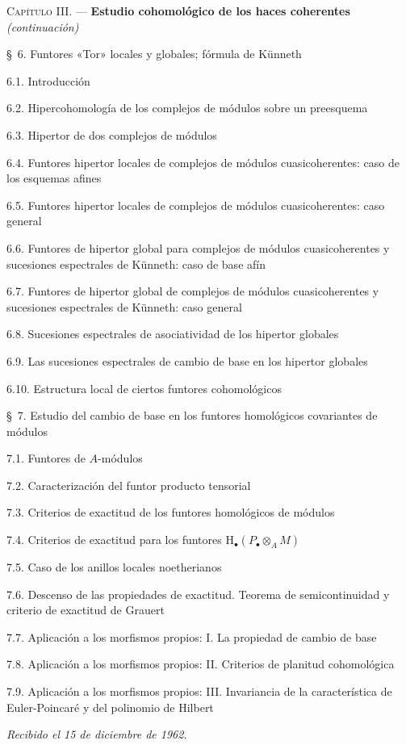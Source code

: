 \documentclass[10pt,oneside,openany]{book}
\theoremstyle{egaenv}\newtheorem*{env}{---}
\theoremstyle{egastatement}
\theoremstyle{egadescription}
\begin{document}
\begin{flushleft}
\textsc{Capítulo III.} --- \textbf{Estudio cohomológico de los haces coherentes}
\textit{(continuación)} 

\medskip
\S~6. Funtores «Tor» locales y globales; fórmula de Künneth 

6.1. Introducción 

6.2. Hipercohomología de los complejos de módulos sobre un preesquema 

6.3. Hipertor de dos complejos de módulos 

6.4. Funtores hipertor locales de complejos de módulos cuasicoherentes: caso
de los esquemas afines 

6.5. Funtores hipertor locales de complejos de módulos cuasicoherentes: caso
general 

6.6. Funtores de hipertor global para complejos de módulos cuasicoherentes y
sucesiones espectrales de Künneth: caso de base afín 

6.7. Funtores de hipertor global de complejos de módulos cuasicoherentes y
sucesiones espectrales de Künneth: caso general 

6.8. Sucesiones espectrales de asociatividad de los hipertor globales 

6.9. Las sucesiones espectrales de cambio de base en los hipertor globales

6.10. Estructura local de ciertos funtores cohomológicos 

\medskip
\S~7. Estudio del cambio de base en los funtores homológicos covariantes de
módulos 

7.1. Funtores de $A$-módulos 

7.2. Caracterización del funtor producto tensorial 

7.3. Criterios de exactitud de los funtores homológicos de módulos 

7.4. Criterios de exactitud para los funtores
$\mathrm H_\bullet(P_\bullet\otimes_A M)$ 

7.5. Caso de los anillos locales noetherianos 

7.6. Descenso de las propiedades de exactitud. Teorema de semicontinuidad y
criterio de exactitud de Grauert 

7.7. Aplicación a los morfismos propios: I. La propiedad de cambio de base

7.8. Aplicación a los morfismos propios: II. Criterios de planitud
cohomológica 

7.9. Aplicación a los morfismos propios: III. Invariancia de la
característica de Euler-Poincaré y del polinomio de Hilbert 

\begin{flushright}
\emph{Recibido el 15 de diciembre de 1962.}
\end{flushright}
\end{flushleft}
\end{document}
